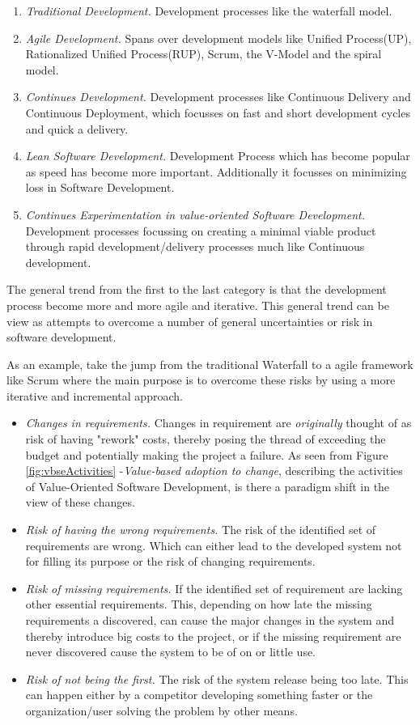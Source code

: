 \documentclass{sig-alternate}
\begin{document}
\begin{enumerate}
\item \textit{Traditional Development.} Development processes like the waterfall model.
\item \textit{Agile Development.} Spans over development models like Unified Process(UP), Rationalized Unified Process(RUP), Scrum, the V-Model and the spiral model.
\item \textit{Continues Development.} Development processes like Continuous Delivery and Continuous Deployment, which focusses on fast and short development cycles and quick a delivery.
\item \textit{Lean Software Development.} Development Process which has become popular as speed has become more important. Additionally it focusses on minimizing loss in Software Development.
\item \textit{Continues Experimentation in value-oriented Software Development.} Development processes focussing on creating a minimal viable product through rapid development/delivery processes much like Continuous development.
\end{enumerate}

The general trend from the first to the last category is that the development process become more 
and more agile and iterative. This general trend can be view as attempts to overcome a number of 
general uncertainties or risk in software development.

As an example, take the jump from the traditional Waterfall to a agile framework like Scrum where 
the main purpose is to overcome these risks by using a more iterative and incremental approach\cite{sutherland:scrum}.

\begin{itemize}
\item \textit{Changes in requirements.} Changes in requirement are \textit{originally} thought of as risk of having "rework" costs, thereby posing the thread of exceeding the budget and potentially making the project a failure. As seen from Figure \ref{fig:vbseActivities} -\textit{Value-based adoption to change}, describing the activities of Value-Oriented Software Development, is there a paradigm shift in the view of these changes.
\item \textit{Risk of having the wrong requirements.} The risk of the identified set of requirements are wrong. Which can either lead to the developed system not for filling its purpose or the risk of changing requirements.
\item \textit{Risk of missing requirements.} If the identified set of requirement are lacking other essential requirements. This, depending on how late the missing requirements a discovered, can cause the major changes in the system and thereby introduce big costs to the project, or if the missing requirement are never discovered cause the system to be of on or little use.
\item \textit{Risk of not being the first.} The risk of the system release being too late. This can happen either by a competitor developing something faster or the organization/user solving the problem by other means.
\end{itemize}
\end{document}
